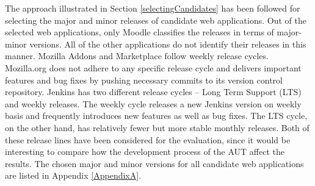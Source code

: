   \begin{table}
  \centering
   \captionsetup{justification=justified,
singlelinecheck=false}
  \caption{Overview of evaluation candidate web applications. `Major Versions' indicate total number of major releases. `Minor version' represents total number of minor revisions. (Note: For Jenkins, two release cycles -- Long Term Support (LTS) and Weekly releases are considered.) }
  \label{appcandidates}
  \end{table}

The approach illustrated in Section \ref{selectingCandidates} has been followed for selecting the major and minor releases of candidate web applications. Out of the selected web applications, only Moodle classifies the releases in terms of major-minor versions. All of the other applications do not identify their releases in this manner. Mozilla Addons and Marketplace follow weekly release cycles. Mozilla.org does not adhere to any specific release cycle and delivers important features and bug fixes by pushing necessary commits to its version control repository. Jenkins has two different release cycles -- Long Term Support (LTS) and weekly releases. The weekly cycle releases a new Jenkins version on weekly basis and frequently introduces new features as well as bug fixes. The LTS cycle, on the other hand, has relatively fewer but more stable monthly releases. Both of these release lines have been considered for the evaluation, since it would be interesting to compare how the development process of the AUT affect the results. The chosen major and minor versions for all candidate web applications are listed in Appendix \ref{AppendixA}.

